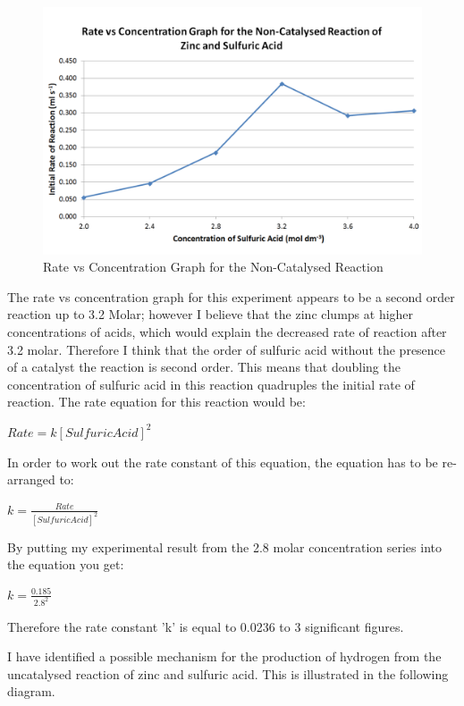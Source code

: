 \begin{figure}[H]
    \includegraphics[width=\textwidth]{./Analysis/Images/1NonCatalyst/ProgressGraph.pdf}
    \caption{Rate vs Concentration Graph for the Non-Catalysed Reaction} \label{fig:ProgressGraphSA}
\end{figure}

The rate vs concentration graph for this experiment appears to be a second order reaction up to 3.2 Molar; however I believe that the zinc clumps at higher concentrations of acids, which would explain the decreased rate of reaction after 3.2 molar. Therefore I think that the order of sulfuric acid without the presence of a catalyst the reaction is second order. This means that doubling the concentration of sulfuric acid in this reaction quadruples the initial rate of reaction. The rate equation for this reaction would be:

$Rate = k [Sulfuric Acid]^2$

In order to work out the rate constant of this equation, the equation has to be re-arranged to:

$k = \frac{Rate}{[Sulfuric Acid]^2}$

By putting my experimental result from the 2.8 molar concentration series into the equation you get:

$k = \frac{0.185}{2.8^2}$

Therefore the rate constant 'k' is equal to 0.0236 to 3 significant figures.

I have identified a possible mechanism for the production of hydrogen from the uncatalysed reaction of zinc and sulfuric acid. This is illustrated in the following diagram.

